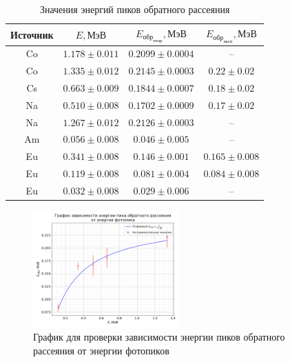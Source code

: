 \documentclass[a4paper, 12pt]{article}
\begin{document}
            \begin{table}[!ht]
                \centering
                \begin{tabular}{|c|c|c|c|}
                    \hline

                    Источник & $E, МэВ$ & $E_{обр_{теор}}, МэВ$ & $E_{обр_{эксп}}, МэВ$\\ \hline
                    Co & $1.178 \pm 0.011$ & $0.2099 \pm 0.0004$ & -- \\ \hline
                    Co & $1.335 \pm 0.012$ & $0.2145 \pm 0.0003$ & $0.22 \pm 0.02$ \\ \hline
                    Cs & $0.663 \pm 0.009$ & $0.1844 \pm 0.0007$ & $0.18 \pm 0.02$\\ \hline
                    Na & $0.510 \pm 0.008$ & $0.1702 \pm 0.0009$ & $0.17 \pm 0.02$\\ \hline
                    Na & $1.267 \pm 0.012$ & $0.2126 \pm 0.0003$ & -- \\ \hline
                    Am & $0.056 \pm 0.008$ & $0.046 \pm 0.005$ & -- \\ \hline
                    Eu & $0.341 \pm 0.008$ & $0.146 \pm 0.001$ & $0.165 \pm 0.008$ \\ \hline
                    Eu & $0.119 \pm 0.008$ & $0.081 \pm 0.004$ & $0.084 \pm 0.008$ \\ \hline
                    Eu & $0.032 \pm 0.008$ & $0.029 \pm 0.006$ & -- \\ \hline

                \end{tabular}
                \caption{Значения энергий пиков обратного рассеяния}
                \label{tab:check_r}
            \end{table}

            \begin{figure}[ht!]
                \begin{center}
                    \includegraphics[width = 0.5\textwidth]{img/plot_rev.png}
                    \caption{График для проверки зависимости энергии пиков обратного рассеяния от энергии фотопиков}
                    \label{plot:check_r}
                \end{center}
            \end{figure}
\end{document}
